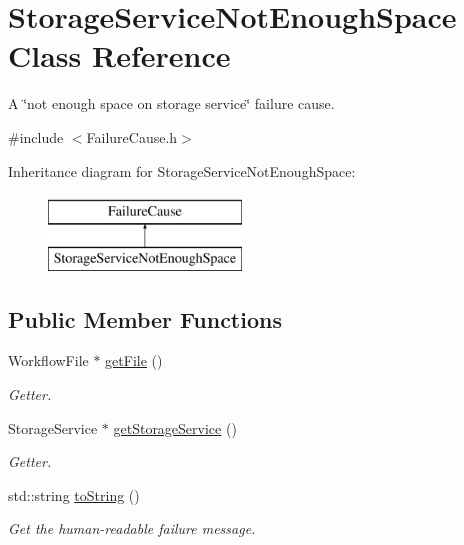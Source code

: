 \hypertarget{class_storage_service_not_enough_space}{}\section{Storage\+Service\+Not\+Enough\+Space Class Reference}
\label{class_storage_service_not_enough_space}


A \char`\"{}not enough space on storage service\char`\"{} failure cause.  




{\ttfamily \#include $<$Failure\+Cause.\+h$>$}

Inheritance diagram for Storage\+Service\+Not\+Enough\+Space\+:\begin{figure}[H]
\begin{center}
\leavevmode
\includegraphics[height=2.000000cm]{class_storage_service_not_enough_space}
\end{center}
\end{figure}
\subsection*{Public Member Functions}
\begin{DoxyCompactItemize}
\item 
Workflow\+File $\ast$ \hyperlink{class_storage_service_not_enough_space_afc2e70e5464f2898a7b3e58048779fe9}{get\+File} ()
\begin{DoxyCompactList}\small\item\em Getter. \end{DoxyCompactList}\item 
Storage\+Service $\ast$ \hyperlink{class_storage_service_not_enough_space_a458c8b73ddb2a600518f0cbf5cd9bdb4}{get\+Storage\+Service} ()
\begin{DoxyCompactList}\small\item\em Getter. \end{DoxyCompactList}\item 
std\+::string \hyperlink{class_storage_service_not_enough_space_a428bbcd962cfdf20e541e2d7673a73ac}{to\+String} ()
\begin{DoxyCompactList}\small\item\em Get the human-\/readable failure message. \end{DoxyCompactList}\end{DoxyCompactItemize}


